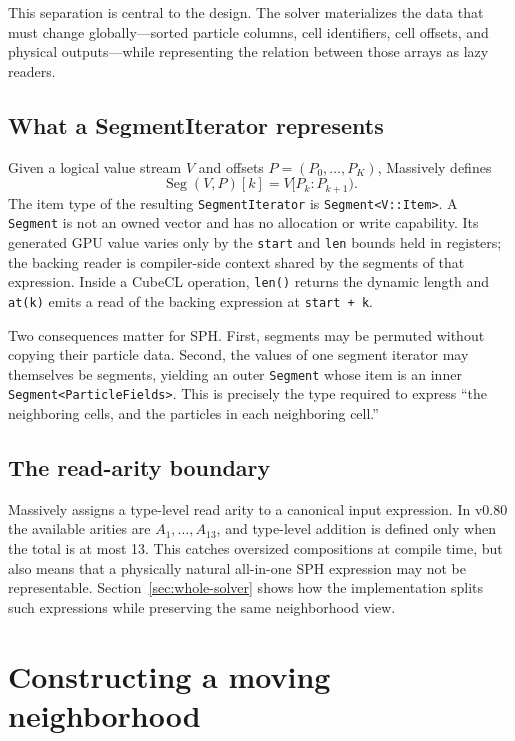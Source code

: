 \documentclass[a4paper,10pt]{article}
\newcommand{\code}[1]{\texttt{#1}}
\newcommand{\Seg}{\operatorname{Seg}}
\begin{document}
This separation is central to the design.  The solver materializes the data that
must change globally---sorted particle columns, cell identifiers, cell offsets,
and physical outputs---while representing the relation between those arrays as
lazy readers.

\subsection{What a SegmentIterator represents}

Given a logical value stream $V$ and offsets
$P=(P_0,\ldots,P_K)$, Massively defines
\begin{equation}
 \Seg(V,P)[k] = V[P_k:P_{k+1}).
 \label{eq:segment}
\end{equation}
The item type of the resulting \code{SegmentIterator} is
\code{Segment<V::Item>}.  A \code{Segment} is not an owned vector and has no
allocation or write capability.  Its generated GPU value varies only by the
\code{start} and \code{len} bounds held in registers; the backing reader is
compiler-side context shared by the segments of that expression.  Inside a
CubeCL operation, \code{len()} returns the dynamic length and \code{at(k)} emits
a read of the backing expression at \code{start + k}.

Two consequences matter for SPH.  First, segments may be permuted without
copying their particle data.  Second, the values of one segment iterator may
themselves be segments, yielding an outer \code{Segment} whose item is an inner
\code{Segment<ParticleFields>}.  This is precisely the type required to express
``the neighboring cells, and the particles in each neighboring cell.''

\subsection{The read-arity boundary}

Massively assigns a type-level read arity to a canonical input expression.  In
v0.80 the available arities are $A_1,\ldots,A_{13}$, and type-level addition is
defined only when the total is at most 13.  This catches oversized compositions
at compile time, but also means that a physically natural all-in-one SPH
expression may not be representable.  Section~\ref{sec:whole-solver} shows how
the implementation splits such expressions while preserving the same
neighborhood view.

\section{Constructing a moving neighborhood}
\end{document}
